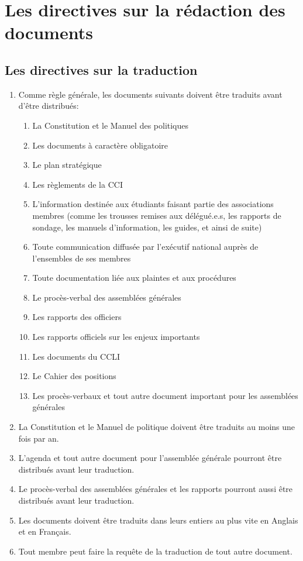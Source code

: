 \section{Les directives sur la rédaction des documents}
\label{les-directives-sur-la-redaction-des-documents}

\subsection{Les directives sur la traduction}
\label{les-directives-sur-la-traduction}

\begin{enumerate}
 \item
  Comme règle générale, les documents suivants doivent être traduits avant d'être distribués:

  \begin{enumerate}
   \item
    La Constitution et le Manuel des politiques
   \item
    Les documents à caractère obligatoire
   \item
    Le plan stratégique
   \item
    Les règlements de la CCI
   \item
    L'information destinée aux étudiants faisant partie des associations membres (comme les trousses remises aux délégué.e.s, les rapports de sondage, les manuels d'information, les guides, et ainsi de suite)
   \item
    Toute communication diffusée par l'exécutif national auprès de l'ensembles de ses membres
   \item
    Toute documentation liée aux plaintes et aux procédures
   \item
    Le procès-verbal des assemblées générales
   \item
    Les rapports des officiers
   \item
    Les rapports officiels sur les enjeux importants
   \item
    Les documents du CCLI
   \item
    Le Cahier des positions
   \item
    Les procès-verbaux et tout autre document important pour les assemblées générales
  \end{enumerate}
 \item
  La Constitution et le Manuel de politique doivent être traduits au moins une fois par an.
 \item
  L'agenda et tout autre document pour l'assemblée générale pourront être distribués avant leur traduction.
 \item
  Le procès-verbal des assemblées générales et les rapports pourront aussi être distribués avant leur traduction.
 \item
  Les documents doivent être traduits dans leurs entiers au plus vite en Anglais et en Français.
 \item
  Tout membre peut faire la requête de la traduction de tout autre document.
\end{enumerate}

